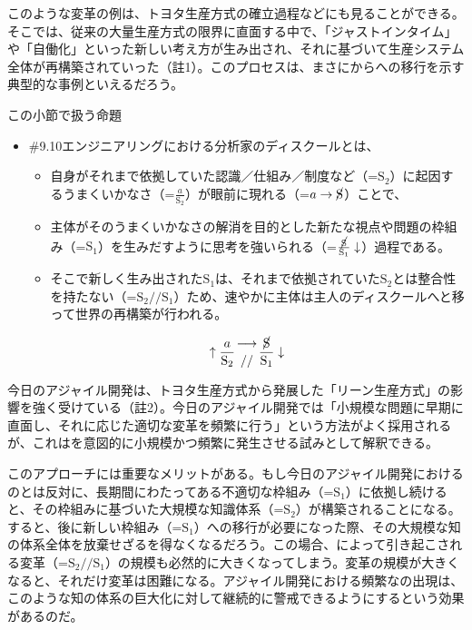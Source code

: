 このような変革の例は、トヨタ生産方式の確立過程などにも見ることができる。そこでは、従来の大量生産方式の限界に直面する中で、「ジャストインタイム」や「自働化」といった新しい考え方が生み出され、それに基づいて生産システム全体が再構築されていった（註1）。このプロセスは、まさにからへの移行を示す典型的な事例といえるだろう。

\begin{note}{}{この小節で扱う命題}
  \begin{itemize}
    \tightlist
    \item{\#9.10}エンジニアリングにおける分析家のディスクールとは、
      \begin{itemize}
        \tightlist
        \item 自身がそれまで依拠していた認識／仕組み／制度など（=$\textrm{S}_2$）に起因するうまくいかなさ（=$\frac{a}{\textrm{S}_2}$）が眼前に現れる（=$a\rightarrow\cancel{\textrm{S}}$）ことで、
        \item 主体がそのうまくいかなさの解消を目的とした新たな視点や問題の枠組み（=$\textrm{S}_1$）を生みだすように思考を強いられる（=$\frac{\cancel{\textrm{S}}}{\textrm{S}_1}\downarrow$）過程である。
        \item そこで新しく生み出された$\textrm{S}_1$は、それまで依拠されていた$\textrm{S}_2$とは整合性を持たない（=$\textrm{S}_2//\textrm{S}_1$）ため、速やかに主体は主人のディスクールへと移って世界の再構築が行われる。
      \end{itemize}

$$
\uparrow\frac{a}{\mathrm{S_2}}\genfrac{}{}{0pt}{}{\longrightarrow}{//}\frac{\cancel{\textrm{S}}}{\mathrm{S_1}}\downarrow
$$
  \end{itemize}
\end{note}

今日のアジャイル開発は、トヨタ生産方式から発展した「リーン生産方式」の影響を強く受けている（註2）。今日のアジャイル開発では「小規模な問題に早期に直面し、それに応じた適切な変革を頻繁に行う」という方法がよく採用されるが、これはを意図的に小規模かつ頻繁に発生させる試みとして解釈できる。

このアプローチには重要なメリットがある。もし今日のアジャイル開発におけるのとは反対に、長期間にわたってある不適切な枠組み（=\(\textrm{S}_1\)）に依拠し続けると、その枠組みに基づいた大規模な知識体系（=\(\textrm{S}_2\)）が構築されることになる。すると、後に新しい枠組み（=\(\textrm{S}_1\)）への移行が必要になった際、その大規模な知の体系全体を放棄せざるを得なくなるだろう。この場合、によって引き起こされる変革（=\(\textrm{S}_2//\textrm{S}_1\)）の規模も必然的に大きくなってしまう。変革の規模が大きくなると、それだけ変革は困難になる。アジャイル開発における頻繁なの出現は、このような知の体系の巨大化に対して継続的に警戒できるようにするという効果があるのだ。

